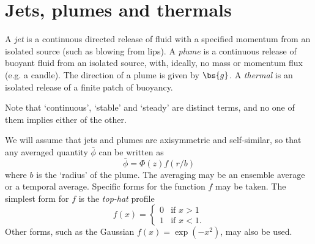 \newpage
\chapter{Jets, plumes and thermals} \label{section4}

A \textit{jet} is a continuous directed release of fluid with a specified
momentum from an isolated source (such as blowing from lips). A \textit{plume}
is a continuous release of buoyant fluid from an isolated source, with, ideally,
no mass or momentum flux (e.g. a candle). The direction of a plume is given by
$\bs{g}$. A \textit{thermal} is an isolated release of a finite patch of
buoyancy.

Note that `continuous', `stable' and `steady' are distinct terms, and no one of
them implies either of the other. 

We will assume that jets and plumes are axisymmetric and self-similar, so that
any averaged quantity $\bar\phi$ can be written as
\begin{equation}
 \bar\phi = \Phi(z) f(r/b)
\end{equation}
where $b$ is the `radius' of the plume. The averaging may be an ensemble average
or a temporal average. Specific forms for the function $f$ may be taken. The
simplest form for $f$ is the \textit{top-hat} profile
\begin{equation}
 f(x) = \begin{cases} 
  0 & \text{if } x>1\\
  1 & \text{if } x<1.
 \end{cases}
\end{equation} 
Other forms, such as the Gaussian $f(x) = \exp(-x^2)$, may also be used.






